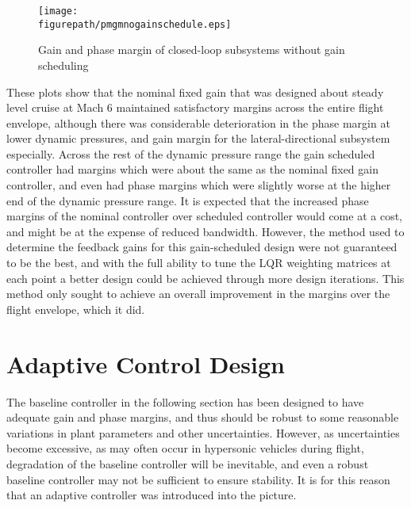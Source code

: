 \begin{figure}[H]
  \begin{center}
    \texttt{[image: \\figurepath/pmgmnogainschedule.eps]}
    \caption{Gain and phase margin of closed-loop subsystems without gain scheduling \label{fig:pmgmnogs}}
  \end{center}
\end{figure}

These plots show that the nominal fixed gain that was designed about steady level cruise at Mach 6 maintained satisfactory margins across the entire flight envelope, although there was considerable deterioration in the phase margin at lower dynamic pressures, and gain margin for the lateral-directional subsystem especially.
Across the rest of the dynamic pressure range the gain scheduled controller had margins which were about the same as the nominal fixed gain controller, and even had phase margins which were slightly worse at the higher end of the dynamic pressure range.
It is expected that the increased phase margins of the nominal controller over scheduled controller would come at a cost, and might be at the expense of reduced bandwidth.
However, the method used to determine the feedback gains for this gain-scheduled design were not guaranteed to be the best, and with the full ability to tune the LQR weighting matrices at each point a better design could be achieved through more design iterations.
This method only sought to achieve an overall improvement in the margins over the flight envelope, which it did.

\section{Adaptive Control Design}
\label{sec:adaptivedesign}

The baseline controller in the following section has been designed to have adequate gain and phase margins, and thus should be robust to some reasonable variations in plant parameters and other uncertainties.
However, as uncertainties become excessive, as may often occur in hypersonic vehicles during flight, degradation of the baseline controller will be inevitable, and even a robust baseline controller may not be sufficient to ensure stability.
It is for this reason that an adaptive controller was introduced into the picture.

